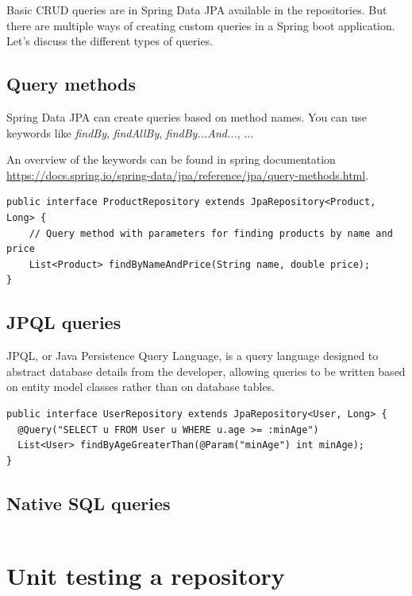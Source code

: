 Basic CRUD queries are in Spring Data JPA available in the repositories. But there are multiple ways of creating custom queries in a Spring boot application. Let's discuss the different
types of queries.

\subsection{Query methods}

Spring Data JPA can create queries based on method names. You can use keywords like \textit{findBy}, \textit{findAllBy},
\textit{findBy...And...}, ...

An overview of the keywords can be found in spring documentation \url{https://docs.spring.io/spring-data/jpa/reference/jpa/query-methods.html}.

\begin{lstlisting}
public interface ProductRepository extends JpaRepository<Product, Long> {
    // Query method with parameters for finding products by name and price
    List<Product> findByNameAndPrice(String name, double price);
}
\end{lstlisting}

\subsection{JPQL queries}

JPQL, or Java Persistence Query Language, is a query language designed to abstract database details from the developer, allowing queries to be written based on entity model classes rather than on database tables.


\begin{lstlisting}
public interface UserRepository extends JpaRepository<User, Long> {
  @Query("SELECT u FROM User u WHERE u.age >= :minAge")
  List<User> findByAgeGreaterThan(@Param("minAge") int minAge);
}
\end{lstlisting}

\subsection{Native SQL queries}

\begin{lstlisting}

\end{lstlisting}


\section{Unit testing a repository}

